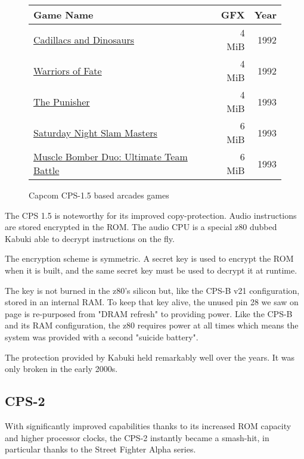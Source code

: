 \begin{figure}[H]
{ \setlength{\tabcolsep}{3.0pt}
\begin{tabularx}{\textwidth}{Xrr}
  \toprule    
  \textbf{Game Name} & \textbf{ GFX }  & \textbf{ Year } \\               
  \toprule    
\href{}{Cadillacs and Dinosaurs} & 4 MiB & 1992 \\ 
\href{}{Warriors of Fate} & 4 MiB & 1992 \\ 
\href{}{The Punisher} & 4 MiB & 1993 \\ 
\href{}{Saturday Night Slam Masters} & 6 MiB & 1993 \\ 
\href{}{Muscle Bomber Duo: Ultimate Team Battle} & 6 MiB & 1993 \\ 
  \toprule    
\end{tabularx}%
}\caption*{Capcom CPS-1.5 based arcades games}
\end{figure}

\label{kabuki}
The CPS 1.5 is noteworthy for its improved copy-protection. Audio instructions are stored encrypted in the ROM. The audio CPU is a special z80 dubbed Kabuki\cite{arcadeHackerKabuki} able to decrypt instructions on the fly.

The encryption scheme is symmetric. A secret key is used to encrypt the ROM when it is built, and the same secret key must be used to decrypt it at runtime.

The key is not burned in the z80's silicon but, like the CPS-B v21 configuration, stored in an internal RAM. To keep that key alive, the unused pin 28 we saw on page \pageref{z80_pinRFSH} is re-purposed from "DRAM refresh" to providing power. Like the CPS-B and its RAM configuration, the z80 requires power at all times which means the system was provided with a second "suicide battery". 





\begin{trivia}
The protection provided by Kabuki held remarkably well over the years. It was only broken in the early 2000s\cite{mame_kabuki}.
\end{trivia}

\subsection{CPS-2}
With significantly improved capabilities thanks to its increased ROM capacity and higher processor clocks, the CPS-2 instantly became a smash-hit, in particular thanks to the Street Fighter Alpha series. 

